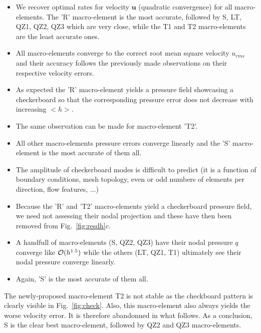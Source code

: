 \documentclass[a4paper,12pt]{article}
\begin{document}
\begin{itemize}

\item We recover optimal rates for velocity ${\bm u}$ (quadratic convergence) for all macro-elements.
The 'R' macro-element is the most accurate, followed by S, LT, QZ1, QZ2, QZ3 which are very close, 
while the T1 and T2 macro-elements are the least accurate ones. 
\item All macro-elements converge to the correct root mean square velocity $u_{rms}$ and 
their accuracy follows the previously made observations on their respective velocity errors.

\item As expected the 'R' macro-element yields a pressure field showcasing a checkerboard so that 
the corresponding pressure error does not decrease with increasing $<h>$. 
\item The same observation can be made for macro-element 'T2'. 
\item All other macro-elements pressure errors converge linearly and the 'S' macro-element is
the most accurate of them all.
\item The amplitude of checkerboard modes is difficult to predict (it is a function 
of boundary conditions, mesh topology, even or odd numbers of elements per direction, flow features, ...) 

\item Because the 'R' and 'T2' macro-elements yield a checkerboard pressure field, we need not
assessing their nodal projection and these have then been removed from Fig.~\ref{fig:resdh}c.
\item A handfull of macro-elements (S, QZ2, QZ3) have their nodal pressure $q$ converge like ${\cal O}(h^{1.5})$
while the others (LT, QZ1, T1) ultimately see their nodal pressure converge linearly.
\item Again, 'S' is the most accurate of them all.

\end{itemize}


The newly-proposed macro-element T2 is not stable as the checkboard pattern is clearly visible 
in Fig.~\ref{fig:check}. 
Also, this macro-element also always yields the worse velocity error. It is therefore abandonned in what follows. 
As a conclusion, S is the clear best macro-element, followed by QZ2 and QZ3 macro-elements.

\end{document}
